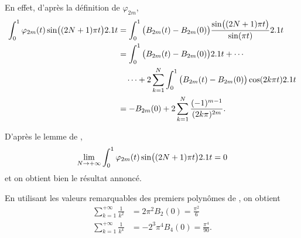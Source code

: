 \begin{elemsolution}
\begin{reponses}[resume]
\begin{reponses}
En effet, d'après la définition de $\varphi_{2m}$,
\begin{align*}
\int_0^1 \varphi_{2m}(t) \sin\mathopen{}\big((2N+1) \pi t \big) 2.1 t &= \int_0^1 \big(B_{2m}(t) - B_{2m}(0) \big) \frac{\sin\mathopen{}\big((2N+1) \pi t \big)}{\sin(\pi t)} 2.1 t \\
&= \int_0^1 \big( B_{2m}(t) - B_{2m}(0) \big) 2.1 t + \cdots \\
&\quad \cdots + 2 \sum_{k=1}^N \int_0^1 \big(B_{2m}(t) - B_{2m}(0) \big) \cos(2 k \pi t) 2.1 t \\
&= - B_{2m}(0) + 2 \sum_{k=1}^N \frac{(-1)^{m-1}}{(2 k \pi)^{2m}}.
\end{align*}
\item D'après le lemme de ,
\[
\lim_{N\to+\infty} \int_0^1 \varphi_{2m}(t) \sin\mathopen{}\big((2N+1) \pi t \big) 2.1 t = 0
\]
et on obtient bien le résultat annoncé.
\end{reponses}
\end{reponses}
\end{elemsolution}

\begin{remarque}
En utilisant les valeurs remarquables des premiers polynômes de , on obtient
\begin{align*}
\sum_{k=1}^{+\infty} \frac{1}{k^2} &= 2 \pi^2 B_2(0) = \frac{\pi^2}{6} \\
\sum_{k=1}^{+\infty} \frac{1}{k^4} &= -2^3 \pi^4 B_4(0) = \frac{\pi^4}{90}.
\end{align*}
\end{remarque}
